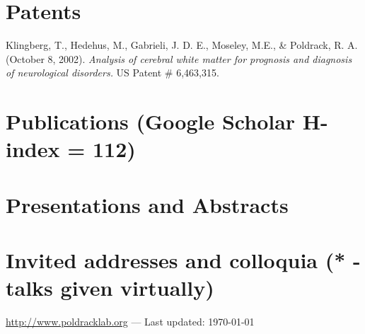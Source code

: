 \documentclass[10pt, letterpaper]{article}
\begin{document}
\section*{Patents}
Klingberg, T., Hedehus, M., Gabrieli, J. D. E., Moseley, M.E., \& Poldrack, R. A. (October 8, 
2002). \textit{Analysis of cerebral white matter for prognosis and diagnosis of neurological disorders.} US Patent \# 
6,463,315. 

\section*{Publications (Google Scholar H-index = 112)}



\section*{Presentations and Abstracts}



\section*{Invited addresses and colloquia (* - talks given virtually)}



\vfill{}
\hrulefill

\begin{center}
{\footnotesize \href{http://www.poldracklab.org}{http://www.poldracklab.org} — Last updated: \today
}
\end{center}
\end{document}
